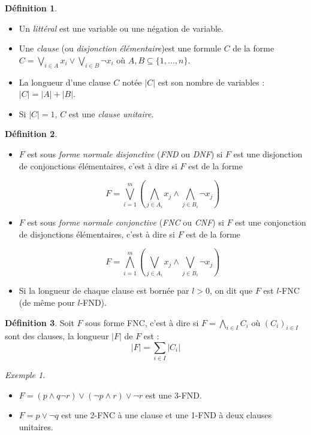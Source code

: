 \documentclass[]{article}
\theoremstyle{remark}
\newtheorem{myexmpl}{Exemple}
\theoremstyle{definition}
\newtheorem{mydef}{Définition}
\begin{document}
\begin{mydef}
	\leavevmode
	\begin{itemize}
		\item Un \textit{littéral} est une variable ou une négation de variable.
		
		\item Une \textit{clause} (ou \textit{disjonction élémentaire})est une formule $C$ de la forme $\displaystyle C = \bigvee_{i \in A}x_i \lor \bigvee_{i \in B} \neg x_i$ où $A, B \subseteq \{1, ..., n\}$.
		
		\item La longueur d'une clause $C$ notée $|C|$ est son nombre de variables : $|C|=|A|+|B|$.
		
		\item Si $|C|=1$, $C$ est une \textit{clause unitaire}.
	\end{itemize}
\end{mydef}

\begin{mydef}
	\leavevmode
	\begin{itemize}
		\item $F$ est sous \textit{forme normale disjonctive} (\textit{FND} ou \textit{DNF}) si $F$ est une disjonction de conjonctions élémentaires, c'est à dire si $F$ est de la forme
		
		$$F = \bigvee_{i=1}^m \left(\bigwedge_{j \in A_i} x_j \land \bigwedge_{j \in B_i} \neg x_j \right)$$
		
		\item $F$ est sous \textit{forme normale conjonctive} (\textit{FNC} ou \textit{CNF}) si $F$ est une conjonction de disjonctions élémentaires, c'est à dire si $F$ est de la forme
		
		$$F = \bigwedge_{i=1}^m \left(\bigvee_{j \in A_i} x_j \land \bigvee_{j \in B_i} \neg x_j \right)$$
		
		\item Si la longueur de chaque clause est bornée par $l > 0$, on dit que $F$ est $l$-FNC (de même pour $l$-FND).
	\end{itemize}
\end{mydef}

\begin{mydef}
	Soit $F$ sous forme FNC, c'est à dire si $\displaystyle F=\bigwedge_{i \in I} C_i$ où $(C_i)_{i \in I}$ sont des clauses, la longueur $|F|$ de $F$ est : $$|F| = \sum_{i \in I} |C_i|$$ 
\end{mydef}

\begin{myexmpl}
	\leavevmode
	\begin{itemize}
		\item $F = (p \land q \neg r) \lor (\neg p \land r) \lor \neg r$ est une 3-FND.
		
		\item $F = p \lor \neg q$ est une 2-FNC à une clause et une 1-FND à deux clauses unitaires.
	\end{itemize}
\end{myexmpl}
\end{document}
